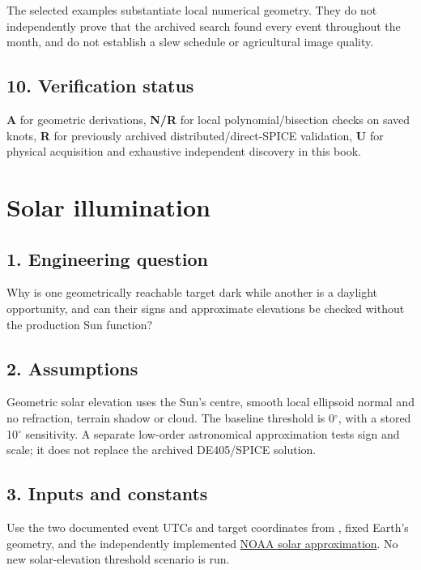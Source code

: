 \documentclass[10pt,a4paper]{article}
\numberwithin{equation}{section}
\begin{document}
\begin{sloppypar}The selected examples substantiate local numerical geometry. They do not independently prove that the archived search found every event throughout the month, and do not establish a slew schedule or agricultural image quality.\end{sloppypar}


\subsection*{10. Verification status}
\begin{sloppypar}\textbf{A} for geometric derivations, \textbf{N/R} for local polynomial/bisection checks on saved knots, \textbf{R} for previously archived distributed/direct-SPICE validation, \textbf{U} for physical acquisition and exhaustive independent discovery in this book.\end{sloppypar}


\clearpage\section{Solar illumination}\label{ch:8}

\subsection*{1. Engineering question}
\begin{sloppypar}Why is one geometrically reachable target dark while another is a daylight opportunity, and can their signs and approximate elevations be checked without the production Sun function?\end{sloppypar}


\subsection*{2. Assumptions}
\begin{sloppypar}Geometric solar elevation uses the Sun's centre, smooth local ellipsoid normal and no refraction, terrain shadow or cloud. The baseline threshold is 0\ensuremath{{}^{\circ}}, with a stored 10\ensuremath{{}^{\circ}} sensitivity. A separate low-order astronomical approximation tests sign and scale; it does not replace the archived DE405/SPICE solution.\end{sloppypar}


\subsection*{3. Inputs and constants}
\begin{sloppypar}Use the two documented event UTCs and target coordinates from \cite{S09}, fixed Earth's geometry, and the independently implemented \href{https://gml.noaa.gov/grad/solcalc/solareqns.PDF}{NOAA solar approximation}. No new solar-elevation threshold scenario is run.\end{sloppypar}
\end{document}
